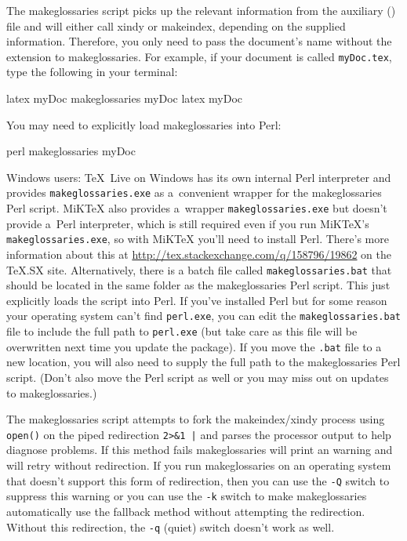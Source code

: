 \documentclass[report,inlinetitle]{nlctdoc}
\begin{document}
The \gls{makeglossaries} script picks up the relevant information
from the auxiliary () file and will either call
\gls{xindy} or \gls{makeindex}, depending on the supplied
information. Therefore, you only need to pass the document's name
without the extension to \gls*{makeglossaries}. For example, if your
document is called \texttt{myDoc.tex}, type the following in your
terminal:
\begin{prompt}
latex myDoc
makeglossaries myDoc
latex myDoc
\end{prompt}
You may need to explicitly load \gls{makeglossaries} into Perl:
\begin{prompt}
perl makeglossaries myDoc
\end{prompt}

Windows users: TeX~Live on Windows has its own internal Perl
interpreter and provides \texttt{makeglossaries.exe} as a~convenient
wrapper for the \gls{makeglossaries} Perl script. MiKTeX also
provides a~wrapper \texttt{makeglossaries.exe} but doesn't provide
a~Perl interpreter, which is still required even if you run MiKTeX's
\texttt{makeglossaries.exe}, so with MiKTeX you'll need to install
Perl. There's more information about this at
\url{http://tex.stackexchange.com/q/158796/19862} on the TeX.SX
site. Alternatively, there is a batch file called
\texttt{makeglossaries.bat} that should be located in the same
folder as the \gls{makeglossaries} Perl script. This just explicitly
loads the script into Perl. If you've installed Perl but for some
reason your operating system can't find \texttt{perl.exe}, you can
edit the \texttt{makeglossaries.bat} file to include the full path
to \texttt{perl.exe} (but take care as this file will be overwritten
next time you update the  package). If you move
the \texttt{.bat} file to a new location, you will also need to
supply the full path to the \gls{makeglossaries} Perl script. (Don't
also move the Perl script as well or you may miss out on updates to
\gls{makeglossaries}.)

The \gls{makeglossaries} script attempts to fork the
\gls{makeindex}\slash\gls{xindy} process using \texttt{open()} on the
piped redirection \verb"2>&1 |" and parses the processor output to
help diagnose problems.  If this method fails \gls{makeglossaries}
will print an  warning and will retry without
redirection. If you run \gls{makeglossaries} on an operating system
that doesn't support this form of redirection, then you can use the
\texttt{-Q} switch to suppress this warning or you can use the
\texttt{-k} switch to make \gls{makeglossaries} automatically use
the fallback method without attempting the redirection. Without this
redirection, the \texttt{-q} (quiet) switch doesn't work as well.
\end{document}
